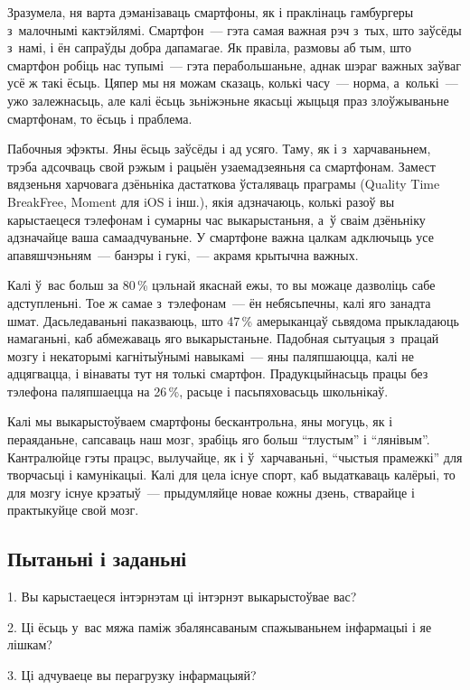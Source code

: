 Зразумела, ня варта дэманізаваць смартфоны, як і праклінаць гамбургеры з~малочнымі кактэйлямі. Смартфон~--- гэта самая важная рэч з~тых, што заўсёды з~намі, і ён сапраўды добра дапамагае. Як правіла, размовы аб тым, што смартфон робіць нас тупымі~--- гэта перабольшаньне, аднак шэраг важных заўваг усё ж такі ёсьць. Цяпер мы ня можам сказаць, колькі часу~--- норма, а~колькі~--- ужо залежнасьць, але калі ёсьць зьніжэньне якасьці жыцьця праз злоўжываньне смартфонам, то ёсьць і праблема.

Пабочныя эфэкты. Яны ёсьць заўсёды і ад усяго. Таму, як і з~харчаваньнем, трэба адсочваць свой рэжым і рацыён узаемадзеяньня са смартфонам. Замест вядзеньня харчовага дзёньніка дастаткова ўсталяваць праграмы (Quality Time BreakFree, Moment для iOS і інш.), якія адзначаюць, колькі разоў вы карыстаецеся тэлефонам і сумарны час выкарыстаньня, а~ў сваім дзёньніку адзначайце ваша самаадчуваньне. У смартфоне важна цалкам адключыць усе апавяшчэньням~--- банэры і гукі,~--- акрамя крытычна важных. 

Калі ў~вас больш за 80\,\% цэльнай якаснай ежы, то вы можаце дазволіць сабе адступленьні. Тое ж самае з~тэлефонам~--- ён небясьпечны, калі яго занадта шмат. Дасьледаваньні паказваюць, што 47\,\% амерыканцаў сьвядома прыкладаюць намаганьні, каб абмежаваць яго выкарыстаньне. Падобная сытуацыя з~працай мозгу і некаторымі кагнітыўнымі навыкамі~--- яны паляпшаюцца, калі не адцягвацца, і вінаваты тут ня толькі смартфон. Прадукцыйнасьць працы без тэлефона паляпшаецца на 26\,\%, расьце і пасьпяховасьць школьнікаў.

Калі мы выкарыстоўваем смартфоны бескантрольна, яны могуць, як і пераяданьне, сапсаваць наш мозг, зрабіць яго больш ``тлустым'' і ``лянівым''. Кантралюйце гэты працэс, вылучайце, як і ў~харчаваньні, ``чыстыя прамежкі'' для творчасьці і камунікацыі. Калі для цела існуе спорт, каб выдаткаваць калёрыі, то для мозгу існуе крэатыў~--- прыдумляйце новае кожны дзень, стварайце і практыкуйце свой мозг.

\subsection*{Пытаньні і заданьні}

1. Вы карыстаецеся інтэрнэтам ці інтэрнэт выкарыстоўвае вас?

2. Ці ёсьць у~вас мяжа паміж збалянсаваным спажываньнем інфармацыі і яе лішкам?

3. Ці адчуваеце вы перагрузку інфармацыяй?


